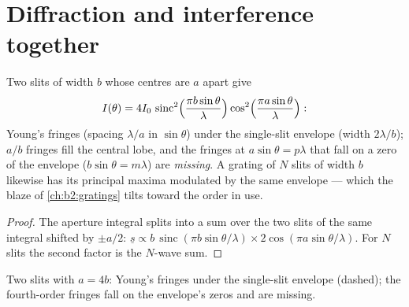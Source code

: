 \section{Diffraction and interference together}

\begin{proposition}\label{prop:b2:diffraction:combined}
Two slits of width $b$ whose centres are $a$ apart give
\[
I(\theta) = 4I_0\,\operatorname{sinc}^2\Bigl(\frac{\pi b\sin\theta}\lambda\Bigr)\cos^2\Bigl(\frac{\pi a\sin\theta}\lambda\Bigr) :
\]
Young's fringes (spacing $\lambda/a$ in $\sin\theta$) under the single-slit
envelope (width $2\lambda/b$); $a/b$ fringes fill the central lobe, and the
fringes at $a\sin\theta = p\lambda$ that fall on a zero of the envelope
($b\sin\theta = m\lambda$) are \emph{missing}. A grating of $N$ slits of width
$b$ likewise has its principal maxima modulated by the same envelope ---
which the blaze of \cref{ch:b2:gratings} tilts toward the order in use.
\end{proposition}

\begin{proof}
The aperture integral splits into a sum over the two slits of the same
integral shifted by $\pm a/2$: $\underline s \propto b\,\operatorname{sinc}(\pi b\sin\theta/\lambda)
\times2\cos(\pi a\sin\theta/\lambda)$. For $N$ slits the second factor is the
$N$-wave sum.
\end{proof}

\begin{omfigure}

{\small Two slits with $a = 4b$: Young's fringes under the single-slit
envelope (dashed); the fourth-order fringes fall on the envelope's
zeros and are missing.}
\end{omfigure}

